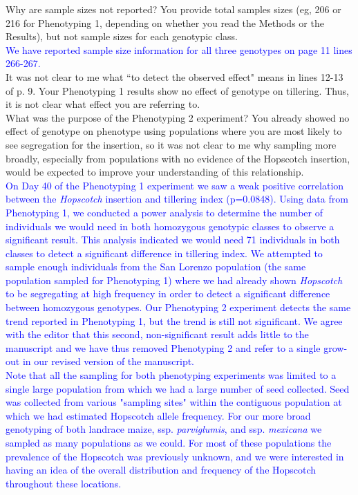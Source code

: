 \documentclass[11pt]{article}
\newcommand{\res}[1]{\noindent \textcolor{blue}{{#1}} \\}
\begin{document}
Why are sample sizes not reported?  You provide total samples sizes (eg, 206 or 216 for Phenotyping 1, depending on whether you read the Methods or the Results), but not sample sizes for each genotypic class.\\

\res{We have reported sample size information for all three genotypes on page 11 lines 266-267.} 

It was not clear to me what ``to detect the observed effect" means in lines 12-13 of p. 9.  Your Phenotyping 1 results show no effect of genotype on tillering.  Thus, it is not clear what effect you are referring to.\\

What was the purpose of the Phenotyping 2  experiment?  You already showed no effect of genotype on phenotype using populations where you are most likely to see segregation for the insertion, so it was not clear to me why sampling more broadly, especially from populations with no evidence of the Hopscotch insertion, would be expected to improve your understanding of this relationship.\\

\res{On Day 40 of the Phenotyping 1 experiment we saw a weak positive correlation between the \emph{Hopscotch} insertion and tillering index (p=0.0848).  
Using data from Phenotyping 1, we conducted a power analysis to determine the number of individuals we would need in both homozygous genotypic classes to observe a significant result.
This analysis indicated we would need 71 individuals in both classes to detect a significant difference in tillering index.  
We attempted to sample enough individuals from the San Lorenzo population (the same population sampled for Phenotyping 1) where we had already shown \emph{Hopscotch} to be segregating at high frequency in order to detect a significant difference between homozygous genotypes.  
Our Phenotyping 2 experiment detects the same trend reported in Phenotyping 1, but the trend is still not significant.
We agree with the editor that this second, non-significant result adds little to the manuscript and we have thus removed Phenotyping 2 and refer to a single grow-out in our revised version of the manuscript.}

\res{Note that all the sampling for both phenotyping experiments was limited to a single large population from which we had a large number of seed collected. Seed was collected from various "sampling sites" within the contiguous population at which we had estimated Hopscotch allele frequency. For our more broad genotyping of both landrace maize, ssp. \emph{parviglumis}, and ssp. \emph{mexicana} we sampled as many populations as we could. For most of these populations the prevalence of the Hopscotch was previously unknown, and we were interested in having an idea of the overall distribution and frequency of the Hopscotch throughout these locations.}
\end{document}
